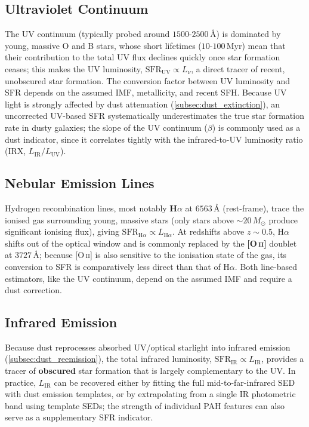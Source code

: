 \subsection{Ultraviolet Continuum} \label{subsec:sfr_uv}

The UV continuum (typically probed around $1500$-$2500\,\text{\AA}$) is dominated by young, massive O and B stars, whose short lifetimes ($10$-$100\,\text{Myr}$) mean that their contribution to the total UV flux declines quickly once star formation ceases; this makes the UV luminosity, $\text{SFR}_{\text{UV}} \propto L_\nu$, a direct tracer of recent, unobscured star formation. The conversion factor between UV luminosity and SFR depends on the assumed IMF, metallicity, and recent SFH. Because UV light is strongly affected by dust attenuation (\cref{subsec:dust_extinction}), an uncorrected UV-based SFR systematically underestimates the true star formation rate in dusty galaxies; the slope of the UV continuum ($\beta$) is commonly used as a dust indicator, since it correlates tightly with the infrared-to-UV luminosity ratio (IRX, $L_{\text{IR}}/L_{\text{UV}}$).

\subsection{Nebular Emission Lines} \label{subsec:sfr_lines}

Hydrogen recombination lines, most notably \textbf{H$\alpha$} at $6563\,\text{\AA}$ (rest-frame), trace the ionised gas surrounding young, massive stars (only stars above $\sim 20\,M_\odot$ produce significant ionising flux), giving $\text{SFR}_{\text{H}\alpha} \propto L_{\text{H}\alpha}$. At redshifts above $z \sim 0.5$, H$\alpha$ shifts out of the optical window and is commonly replaced by the \textbf{[O\,\textsc{ii}]} doublet at $3727\,\text{\AA}$; because [O\,\textsc{ii}] is also sensitive to the ionisation state of the gas, its conversion to SFR is comparatively less direct than that of H$\alpha$. Both line-based estimators, like the UV continuum, depend on the assumed IMF and require a dust correction.

\subsection{Infrared Emission} \label{subsec:sfr_ir}

Because dust reprocesses absorbed UV/optical starlight into infrared emission (\cref{subsec:dust_reemission}), the total infrared luminosity, $\text{SFR}_{\text{IR}} \propto L_{\text{IR}}$, provides a tracer of \textbf{obscured} star formation that is largely complementary to the UV. In practice, $L_{\text{IR}}$ can be recovered either by fitting the full mid-to-far-infrared SED with dust emission templates, or by extrapolating from a single IR photometric band using template SEDs; the strength of individual PAH features can also serve as a supplementary SFR indicator.

